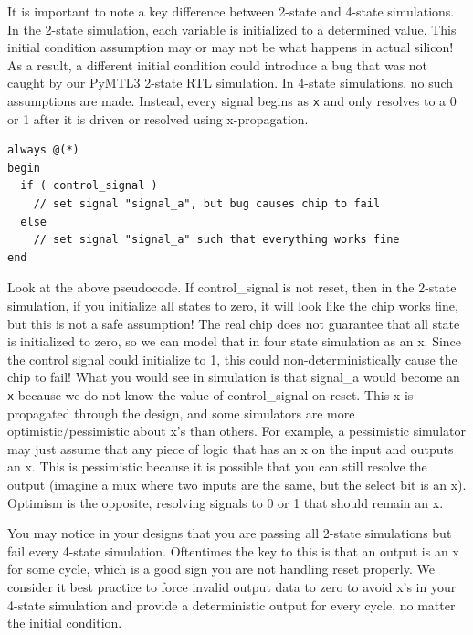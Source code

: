 \documentclass[a4paper,12pt,twoside]{article}
\begin{document}
It is important to note a key difference between 2-state and 4-state simulations. In the 2-state simulation, each variable is initialized to a determined value. This initial condition assumption may or may not be what happens in actual silicon! As a result, a different initial condition could introduce a bug that was not caught by our PyMTL3 2-state RTL simulation. In 4-state simulations, no such assumptions are made. Instead, every signal begins as \texttt{x} and only resolves to a 0 or 1 after it is driven or resolved using x-propagation.
\begin{verbatim}
always @(*)
begin
  if ( control_signal )
    // set signal "signal_a", but bug causes chip to fail
  else
    // set signal "signal_a" such that everything works fine
end
\end{verbatim}
Look at the above pseudocode. If control\_signal is not reset, then in the 2-state simulation, if you initialize all states to zero, it will look like the chip works fine, but this is not a safe assumption! The real chip does not guarantee that all state is initialized to zero, so we can model that in four state simulation as an x. Since the control signal could initialize to 1, this could non-deterministically cause the chip to fail! What you would see in simulation is that signal\_a would become an \texttt{x} because we do not know the value of control\_signal on reset. This x is propagated through the design, and some simulators are more optimistic/pessimistic about x’s than others. For example, a pessimistic simulator may just assume that any piece of logic that has an x on the input and outputs an x. This is pessimistic because it is possible that you can still resolve the output (imagine a mux where two inputs are the same, but the select bit is an x). Optimism is the opposite, resolving signals to 0 or 1 that should remain an x.

You may notice in your designs that you are passing all 2-state simulations but fail every 4-state simulation. Oftentimes the key to this is that an output is an x for some cycle, which is a good sign you are not handling reset properly. We consider it best practice to force invalid output data to zero to avoid x’s in your 4-state simulation and provide a deterministic output for every cycle, no matter the initial condition.
\end{document}
